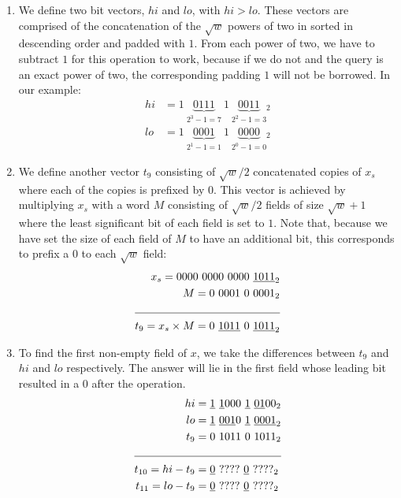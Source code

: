 \begin{enumerate}
    \item \label{blt:parallel1}
    We define two bit vectors, $hi$ and $lo$, with $hi > lo$. These vectors are comprised of the concatenation of the $\sqrt{w}$ powers of two in sorted in descending order and padded with $1$. From each power of two, we have to subtract $1$ for this operation to work, because if we do not and the query is an exact power of two, the corresponding padding $1$ will not be borrowed. In our example:
    \begin{align*}
        hi &= 1\ \underbrace{0111}_{2^3-1=7}\ 1\ \underbrace{0011}_{2^2-1=3}{}_2\\
        lo &= 1\ \underbrace{0001}_{2^1-1=1}\ 1\ \underbrace{0000}_{2^0-1=0}{}_2
    \end{align*}
    
    \item \label{blt:parallel2}
    We define another vector $t_9$ consisting of $\sqrt{w}/2$ concatenated copies of $x_s$ where each of the copies is prefixed by $0$. This vector is achieved by multiplying $x_s$ with a word $M$ consisting of $\sqrt{w}/2$ fields of size $\sqrt{w} + 1$ where the least significant bit of each field is set to $1$. Note that, because we have set the size of each field of $M$ to have an additional bit, this corresponds to prefix a $0$ to each $\sqrt{w}$ field:
    \begin{align*}
        x_s = 0000\ 0000\ 0000\ &\underline{1011}_2\\ 
        M = 0\ 0001\ 0\ &0001_2\\ \cline{1-2}
        t_9 = x_s \times M = 0\ \underline{1011}\ 0\ &\underline{1011}_2
    \end{align*}
    
    \item \label{blt:parallel3}
    To find the first non-empty field of $x$, we take the differences between $t_9$ and $hi$ and $lo$ respectively. The answer will lie in the first field whose leading bit resulted in a $0$ after the operation.
    \begin{align*}
                          hi &= \underline{1}\ \underline{1}000\ \underline{1}\ \underline{01}00_2\\
                          lo &= \underline{1}\ \underline{001}0\ \underline{1}\ \underline{0001}_2 \\
                      t_9 &= 0\ 1011\ 0\ 1011_2\\ \cline{1-2}
        t_{10} = hi - t_9 &= \underline{0}\ ????\ \underline{0}\ ????_2 \\
        t_{11} = lo - t_9 &= \underline{0}\ ????\ \underline{0}\ ????_2
    \end{align*}
    

\end{enumerate}
